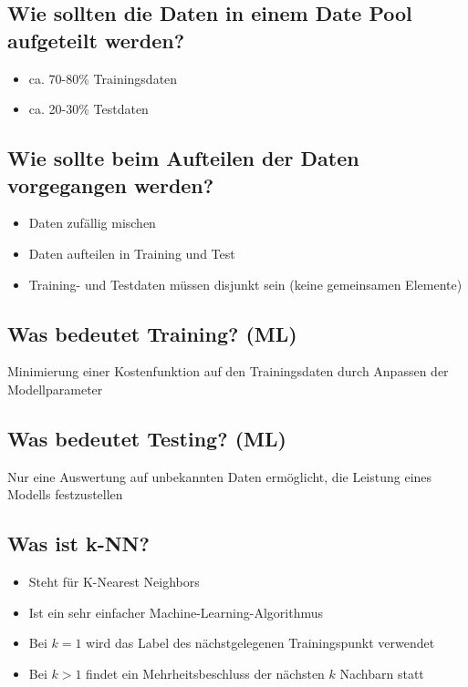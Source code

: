 \documentclass[a4paper]{article}
\begin{document}
		\subsection{Wie sollten die Daten in einem Date Pool aufgeteilt werden?}
		
		\begin{itemize}
			\item ca. 70-80\% Trainingsdaten
			\item ca. 20-30\% Testdaten
		\end{itemize}
	
		\subsection{Wie sollte beim Aufteilen der Daten vorgegangen werden?}
		
		\begin{itemize}
			\item Daten zufällig mischen
			\item Daten aufteilen in Training und Test
			\item Training- und Testdaten müssen disjunkt sein (keine gemeinsamen Elemente)
		\end{itemize}
		
		\subsection{Was bedeutet Training? (ML)}
		
		Minimierung einer Kostenfunktion auf den Trainingsdaten durch Anpassen der Modellparameter
		
		\subsection{Was bedeutet Testing? (ML)}
		
		Nur eine Auswertung auf unbekannten Daten ermöglicht, die Leistung eines Modells festzustellen
		
		\subsection{Was ist k-NN?}
		
		\begin{itemize}
			\item Steht für K-Nearest Neighbors
			\item Ist ein sehr einfacher Machine-Learning-Algorithmus
			\item Bei $k=1$ wird das Label des nächstgelegenen Trainingspunkt verwendet
			\item Bei $k>1$ findet ein Mehrheitsbeschluss der nächsten $k$ Nachbarn statt
		\end{itemize}
		
\end{document}
